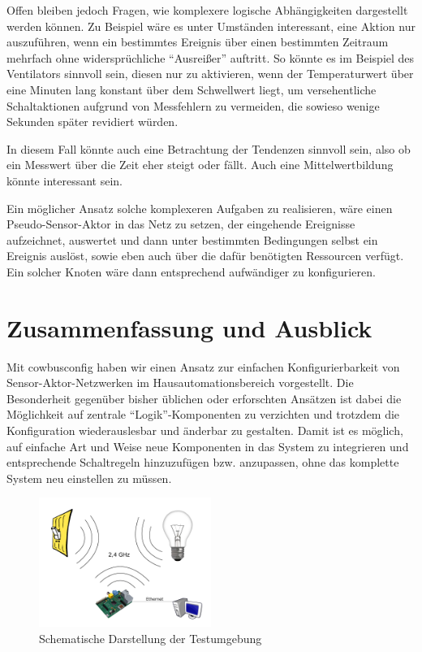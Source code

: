 \documentclass{IEEEtran}
\newcounter{TODOCOUNT}
\newcommand{\TODO}[1]{\vspace{0.5em}\todo[inline, color=orange]{#1}\stepcounter{TODOCOUNT}}
\begin{document}
    \TODO{Evaluation weiter? Positives?}

    Offen bleiben jedoch Fragen, wie komplexere logische Abhängigkeiten
    dargestellt werden können.
    Zu Beispiel wäre es unter Umständen interessant, eine Aktion nur auszuführen,
    wenn ein bestimmtes Ereignis über einen bestimmten Zeitraum mehrfach ohne
    widersprüchliche \enquote{Ausreißer} auftritt.
    So könnte es im Beispiel des Ventilators sinnvoll sein, diesen nur zu
    aktivieren, wenn der Temperaturwert über eine Minuten lang konstant über
    dem Schwellwert liegt, um versehentliche Schaltaktionen aufgrund von
    Messfehlern zu vermeiden, die sowieso wenige Sekunden später revidiert
    würden.

    In diesem Fall könnte auch eine Betrachtung der Tendenzen sinnvoll sein,
    also ob ein Messwert über die Zeit eher steigt oder fällt.
    Auch eine Mittelwertbildung könnte interessant sein.

    Ein möglicher Ansatz solche komplexeren Aufgaben zu realisieren,
    wäre einen Pseudo-Sensor-Aktor in das Netz zu setzen, der eingehende
    Ereignisse aufzeichnet, auswertet und dann unter bestimmten Bedingungen
    selbst ein Ereignis auslöst, sowie eben auch über die dafür benötigten
    Ressourcen verfügt. Ein solcher Knoten wäre dann entsprechend
    aufwändiger zu konfigurieren.


\section{Zusammenfassung und Ausblick}
    Mit cowbusconfig haben wir einen Ansatz zur einfachen Konfigurierbarkeit
    von Sensor-Aktor-Netzwerken im Hausautomationsbereich vorgestellt.
    Die Besonderheit gegenüber bisher üblichen oder erforschten Ansätzen ist
    dabei die Möglichkeit auf zentrale \enquote{Logik}-Komponenten
    zu verzichten und trotzdem die Konfiguration wiederauslesbar und
    änderbar zu gestalten.
    Damit ist es möglich, auf einfache Art und Weise neue Komponenten in das
    System zu integrieren und entsprechende Schaltregeln hinzuzufügen bzw.
    anzupassen, ohne das komplette System neu einstellen zu müssen.


        \begin{figure}
            \centering
            \includegraphics[width=0.5\textwidth]{img/system}
            \caption{Schematische Darstellung der Testumgebung}
            \label{fig:comp}
        \end{figure}
\end{document}
